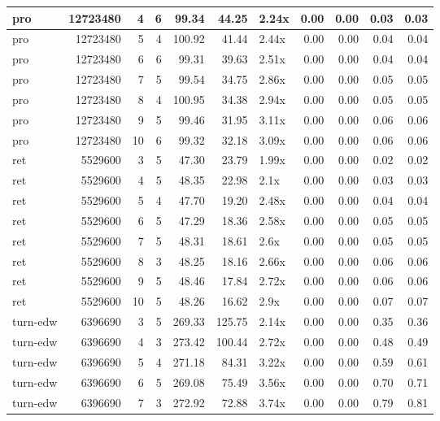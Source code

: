 \begin{table}[ht]
\begin{tabular}{lrrrrrlrrrr}
   \hline
pro & 12723480 &   4 &   6 & 99.34 & 44.25 & 2.24x & 0.00 & 0.00 & 0.03 & 0.03 \\ 
   \hline
pro & 12723480 &   5 &   4 & 100.92 & 41.44 & 2.44x & 0.00 & 0.00 & 0.04 & 0.04 \\ 
   \hline
pro & 12723480 &   6 &   6 & 99.31 & 39.63 & 2.51x & 0.00 & 0.00 & 0.04 & 0.04 \\ 
   \hline
pro & 12723480 &   7 &   5 & 99.54 & 34.75 & 2.86x & 0.00 & 0.00 & 0.05 & 0.05 \\ 
   \hline
pro & 12723480 &   8 &   4 & 100.95 & 34.38 & 2.94x & 0.00 & 0.00 & 0.05 & 0.05 \\ 
   \hline
pro & 12723480 &   9 &   5 & 99.46 & 31.95 & 3.11x & 0.00 & 0.00 & 0.06 & 0.06 \\ 
   \hline
pro & 12723480 &  10 &   6 & 99.32 & 32.18 & 3.09x & 0.00 & 0.00 & 0.06 & 0.06 \\ 
   \hline
ret & 5529600 &   3 &   5 & 47.30 & 23.79 & 1.99x & 0.00 & 0.00 & 0.02 & 0.02 \\ 
   \hline
ret & 5529600 &   4 &   5 & 48.35 & 22.98 & 2.1x & 0.00 & 0.00 & 0.03 & 0.03 \\ 
   \hline
ret & 5529600 &   5 &   4 & 47.70 & 19.20 & 2.48x & 0.00 & 0.00 & 0.04 & 0.04 \\ 
   \hline
ret & 5529600 &   6 &   5 & 47.29 & 18.36 & 2.58x & 0.00 & 0.00 & 0.05 & 0.05 \\ 
   \hline
ret & 5529600 &   7 &   5 & 48.31 & 18.61 & 2.6x & 0.00 & 0.00 & 0.05 & 0.05 \\ 
   \hline
ret & 5529600 &   8 &   3 & 48.25 & 18.16 & 2.66x & 0.00 & 0.00 & 0.06 & 0.06 \\ 
   \hline
ret & 5529600 &   9 &   5 & 48.46 & 17.84 & 2.72x & 0.00 & 0.00 & 0.06 & 0.06 \\ 
   \hline
ret & 5529600 &  10 &   5 & 48.26 & 16.62 & 2.9x & 0.00 & 0.00 & 0.07 & 0.07 \\ 
   \hline
turn-edw & 6396690 &   3 &   5 & 269.33 & 125.75 & 2.14x & 0.00 & 0.00 & 0.35 & 0.36 \\ 
   \hline
turn-edw & 6396690 &   4 &   3 & 273.42 & 100.44 & 2.72x & 0.00 & 0.00 & 0.48 & 0.49 \\ 
   \hline
turn-edw & 6396690 &   5 &   4 & 271.18 & 84.31 & 3.22x & 0.00 & 0.00 & 0.59 & 0.61 \\ 
   \hline
turn-edw & 6396690 &   6 &   5 & 269.08 & 75.49 & 3.56x & 0.00 & 0.00 & 0.70 & 0.71 \\ 
   \hline
turn-edw & 6396690 &   7 &   3 & 272.92 & 72.88 & 3.74x & 0.00 & 0.00 & 0.79 & 0.81 \\ 

\end{tabular}
\end{table}
